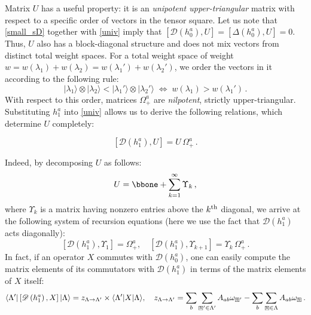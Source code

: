 \documentclass[10pt]{article}
\theoremstyle{definition}
\def\sD{{\mathscr{D}}}
\def\lm{\limits}
\numberwithin{equation}{section}
\newcommand\ssqbox[1]{{
		\setbox0=\hbox{\mbox{$\scriptstyle\Box$}}
		\setbox1=\hbox{\mbox{\raisebox{0.35ex}{\tiny #1}}}
		\mbox{\raisebox{-0.2ex}{\rlap{\hbox to \wd0{\hss{\box1}\hss}}\box0}}
}}
\begin{document}
Matrix $U$ has a useful property: it is an \emph{unipotent upper-triangular} matrix with respect to a specific order of vectors in the tensor square.
Let us note that \eqref{small_sD} together with \eqref{univ} imply that $\left[\sD(h_0^a),U\right]=\left[\Delta(h_0^a),U\right]=0$.
Thus, $U$ also has a block-diagonal structure and does not mix vectors from distinct total weight spaces.
For a total weight space of weight $w=w(\lambda_1)+w(\lambda_2)=w(\lambda_1')+w(\lambda_2')$, we order the vectors in it according to the following rule:
\begin{equation}\label{ord}
	|\lambda_1\rangle\otimes |\lambda_2\rangle < |\lambda_1'\rangle\otimes |\lambda_2'\rangle\;\Longleftrightarrow\; w(\lambda_1)>w(\lambda_1')\,.
\end{equation}
With respect to this order, matrices $\Omega_+^a$ are \emph{nilpotent}, strictly upper-triangular.
Substituting $h_1^a$ into \eqref{univ} allows us to derive the following relations, which determine $U$ completely:
\begin{tcolorbox}
	\begin{equation}\label{main_alg}
		\left[\sD(h_1^a),U\right]=U\,\Omega_+^a\,.
	\end{equation}
\end{tcolorbox}
Indeed, by decomposing $U$ as follows:
\begin{equation}\label{ansatz}
	U=\bbone+\sum\lm_{k=1}^{\infty}\Upsilon_k\,,
\end{equation}
where $\Upsilon_k$ is a matrix having nonzero entries above the $k^{\rm th}$ diagonal, we arrive at the following system of recursion equations (here we use the fact that $\sD(h_1^a)$ acts diagonally):
\begin{equation}\label{recursion}
		\left[\sD(h_1^a),\Upsilon_1\right]=\Omega_+^a,\quad 	\left[\sD(h_1^a),\Upsilon_{k+1}\right]=\Upsilon_k\,\Omega_+^a\,.
\end{equation}
In fact, if an operator $X$ commutes with $\sD\left(h_0^a\right)$, one can easily compute the matrix elements of its commutators with $\sD\left(h_1^a\right)$ in terms of the matrix elements of $X$ itself:
\begin{equation}\label{factor}
	\langle\Lambda'|\left[\sD\left(h_1^a\right),X\right]|\Lambda\rangle=z_{\Lambda\to \Lambda'}\times\langle\Lambda'|X|\Lambda\rangle,\quad z_{\Lambda\to\Lambda'}=\sum\lm_b\sum\lm_{\ssqbox{$b$}'\in\Lambda'}A_{ab}\omega_{\ssqbox{$b$}'}-\sum\lm_b\sum\lm_{\ssqbox{$b$}\in\Lambda}A_{ab}\omega_{\ssqbox{$b$}}\,.
\end{equation}
\end{document}
